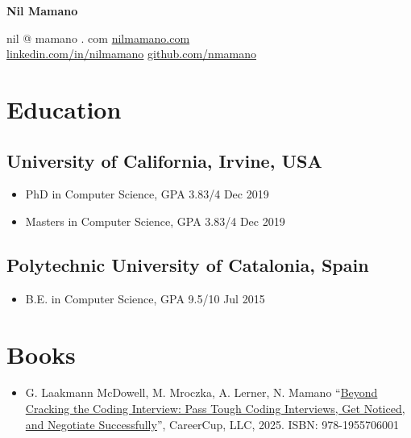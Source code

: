 \documentclass[letterpaper,10pt,oneside]{article}
\begin{document}
\begin{center}
\LARGE{\textbf{Nil Mamano}}\\
\end{center}
\vspace{-2ex}
\hrulefill
\normalsize
\vspace{1em}


\noindent nil @ mamano . com \hfill \href{http://www.nilmamano.com}{nilmamano.com} \\
\noindent\href{https://www.linkedin.com/in/nilmamano/}{linkedin.com/in/nilmamano} \hfill \href{https://github.com/nmamano}{github.com/nmamano}  \\ 


\section*{Education}
\subsection*{University of California, Irvine, USA}
\begin{itemize}
    \item PhD in Computer Science, GPA 3.83/4 \hfill Dec 2019
    \item Masters in Computer Science, GPA 3.83/4 \hfill Dec 2019
\end{itemize}
\subsection*{Polytechnic University of Catalonia, Spain}
\begin{itemize}
    \item B.E. in Computer Science, GPA 9.5/10 \hfill Jul 2015
\end{itemize}

\section*{Books}
\begin{itemize}
    \item G. Laakmann McDowell, M. Mroczka, A. Lerner, N. Mamano ``\href{https://www.amazon.com/dp/195570600X}{Beyond Cracking the Coding Interview: Pass Tough Coding Interviews, Get Noticed, and Negotiate Successfully}'', CareerCup, LLC, 2025. ISBN: 978-1955706001
\end{itemize}
\end{document}

